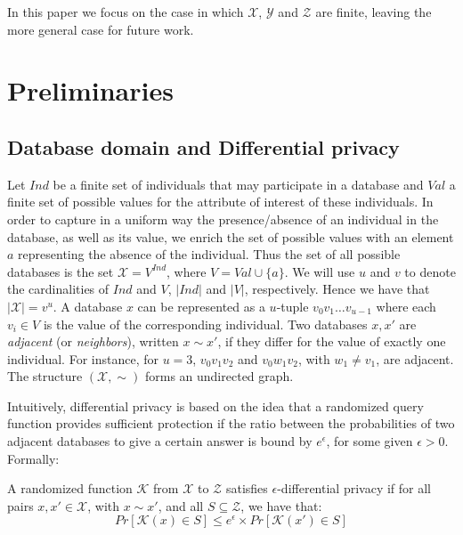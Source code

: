 \documentclass{llncs}
\newcommand{\calx}{\mathcal{X}}
\newcommand{\caly}{\mathcal{Y}}
\newcommand{\calz}{\mathcal{Z}}
\begin{document}
In this paper we focus on the case in which $\calx$, $\caly$ and $\calz$ are finite, leaving the more general case for future work. 

\section{Preliminaries}
\label{section:preliminaries}

\subsection{Database domain and Differential privacy}

Let $\mathit{Ind}$ be a finite set of individuals that may participate in a database and $\mathit{Val}$ a finite
set of possible values for the attribute of interest of these individuals. In order to capture in a uniform way the presence/absence of an individual in the database, as well as its value, 
we enrich the set of possible values with an element $a$ representing the absence of the individual. Thus the set of all possible databases is the set $\calx = V^\mathit{Ind}$, where $V = \mathit{Val} \cup\{a\}$. 
We will use $u$ and $v$ to denote the cardinalities of  $\mathit{Ind}$ and $\mathit{V}$, $|\mathit{Ind}|$ and $|\mathit{V}|$, respectively. Hence we have that $|\calx| = v^\mathit{u}$. 
A database $x$ can be represented as a 
$u$-tuple $v_0v_1\ldots v_{u-1}$ where each $v_i \in V$ is the value of the corresponding individual. 
Two databases $x,x'$ are \emph{adjacent} (or \emph{neighbors}), written $x\sim x'$, if they differ for the value of exactly one individual. For instance, for $u=3$, $v_0v_1v_2$ and $v_0w_1 v_{2}$, with $w_1 \neq v_1$, are adjacent. 
The structure $(\calx,\sim)$ forms an undirected graph. 


Intuitively, differential privacy is based on the idea that a randomized query function  provides sufficient protection if the ratio between the probabilities of two adjacent databases to give a certain answer is bound by $e^\epsilon$, for some given $\epsilon > 0$. 
Formally:
\begin{definition}
	\label{def:diff-privacy-1}
	A randomized function $\mathcal{K}$ from $\calx$ to $\calz$ satisfies {$\epsilon$-differential privacy} if for all pairs $x,x'\in \calx$, with $x\sim x'$, and all $S \subseteq \calz$, we have that:
	\begin{equation*}
		\mathit{Pr}[\mathcal{K}(x) \in S] \leq e^{\epsilon} \times \mathit{Pr}[\mathcal{K}(x') \in S]		
	\end{equation*}	
\end{definition}
\end{document}
